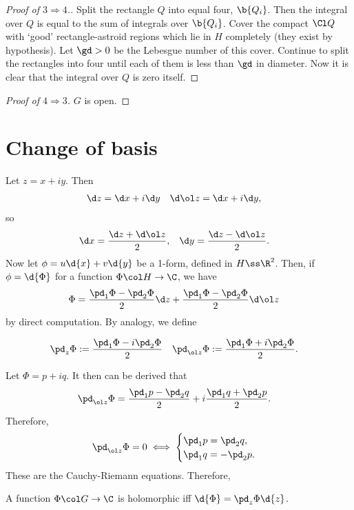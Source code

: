 \documentclass[a4paper, 12pt]{article}
\begin{document}
\begin{proof}[Proof of $3 \Rightarrow 4$.]
  Split the rectangle $Q$ into equal four, $\b{Q_i}$.
  Then the integral over $Q$ is equal to the sum of integrals over $\b{Q_i}$.
  Cover the compact $\Cl Q$ with `good' rectangle-astroid regions which lie in $H$ completely (they exist by hypothesis).
  Let $\gd > 0$ be the Lebesgue number of this cover.
  Continue to split the rectangles into four until each of them is less than $\gd$ in diameter.
  Now it is clear that the integral over $Q$ is zero itself.
\end{proof}

\begin{proof}[Proof of $4 \Rightarrow 3$]
  $G$ is open.
\end{proof}

\section{Change of basis}

Let $z = x+iy$. Then
\begin{align*}
  \d z &= \d x + i \d y &
  \d \ol z &= \d x + i \d y,
\end{align*}
so
\begin{align*}
  \d x &= \frac{\d z + \d \ol z}{2}, &
  \d y &= \frac{\d z - \d \ol z}{2}.
\end{align*}
Now let $\phi = u \d{x} +v\d{y}$ be a 1-form, defined in $H \ss \R^2$. Then, if $\phi = \d{\Phi}$ for a function $\Phi \col H \to \C$, we have
\begin{align*}
  \Phi &= \frac{\pd_1 \Phi - \pd_2 \Phi}{2} \d z
  + \frac{\pd_1 \Phi - \pd_2 \Phi}{2} \d \ol z
\end{align*}
by direct computation.
By analogy, we define
\begin{definition}
  \begin{align*}
  \pd_z \Phi &:= \frac{\pd_1 \Phi - i \pd_2 \Phi}{2} &
  \pd_{\ol z} \Phi &:= \frac{\pd_1 \Phi + i \pd_2 \Phi}{2}.
\end{align*}
\end{definition}
Let $\Phi = p + iq$.
It then can be derived that
\begin{align*}
  \pd_{\ol z} \Phi
  &= \frac{\pd_1 p - \pd_2 q}{2}
  + i \frac{\pd_1 q + \pd_2 p}{2}.
\end{align*}
Therefore,
\begin{align*}
  \pd_{\ol z} \Phi = 0 
  \iff
  \begin{cases}
    \pd_1 p = \pd_2 q, \\
    \pd_1 q = -\pd_2 p.
  \end{cases}
\end{align*}
These are the Cauchy-Riemann equations.
Therefore,
\begin{lemma}
  A function $\Phi \col G \to \C$ is holomorphic iff $\d{\Phi} = \pd_{z} \Phi \d{z}$.
\end{lemma}
\end{document}
